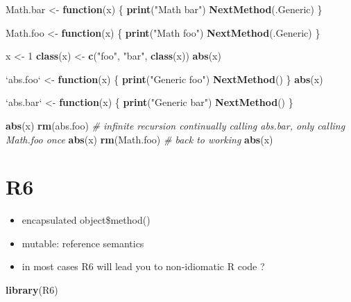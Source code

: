 \documentclass[]{book}
\newenvironment{Shaded}{\begin{snugshade}}{\end{snugshade}}
\newcommand{\CommentTok}[1]{\textcolor[rgb]{0.56,0.35,0.01}{\textit{#1}}}
\newcommand{\ControlFlowTok}[1]{\textcolor[rgb]{0.13,0.29,0.53}{\textbf{#1}}}
\newcommand{\DataTypeTok}[1]{\textcolor[rgb]{0.13,0.29,0.53}{#1}}
\newcommand{\DecValTok}[1]{\textcolor[rgb]{0.00,0.00,0.81}{#1}}
\newcommand{\KeywordTok}[1]{\textcolor[rgb]{0.13,0.29,0.53}{\textbf{#1}}}
\newcommand{\NormalTok}[1]{#1}
\newcommand{\StringTok}[1]{\textcolor[rgb]{0.31,0.60,0.02}{#1}}
\begin{document}
\begin{Shaded}
\begin{Highlighting}[]
\NormalTok{Math.bar <-}\StringTok{ }\ControlFlowTok{function}\NormalTok{(x) \{}
  \KeywordTok{print}\NormalTok{(}\StringTok{"Math bar"}\NormalTok{)}
  \KeywordTok{NextMethod}\NormalTok{(.Generic)}
\NormalTok{\}}

\NormalTok{Math.foo <-}\StringTok{ }\ControlFlowTok{function}\NormalTok{(x) \{}
  \KeywordTok{print}\NormalTok{(}\StringTok{"Math foo"}\NormalTok{)}
  \KeywordTok{NextMethod}\NormalTok{(.Generic)}
\NormalTok{\}}

\NormalTok{x <-}\StringTok{ }\DecValTok{1}
\KeywordTok{class}\NormalTok{(x) <-}\StringTok{ }\KeywordTok{c}\NormalTok{(}\StringTok{"foo"}\NormalTok{, }\StringTok{"bar"}\NormalTok{, }\KeywordTok{class}\NormalTok{(x))}
\KeywordTok{abs}\NormalTok{(x)}

\StringTok{`}\DataTypeTok{abs.foo}\StringTok{`}\NormalTok{ <-}\StringTok{ }\ControlFlowTok{function}\NormalTok{(x) \{}
  \KeywordTok{print}\NormalTok{(}\StringTok{"Generic foo"}\NormalTok{)}
  \KeywordTok{NextMethod}\NormalTok{()}
\NormalTok{\}}
\KeywordTok{abs}\NormalTok{(x)}

\StringTok{`}\DataTypeTok{abs.bar}\StringTok{`}\NormalTok{ <-}\StringTok{ }\ControlFlowTok{function}\NormalTok{(x) \{}
  \KeywordTok{print}\NormalTok{(}\StringTok{"Generic bar"}\NormalTok{)}
  \KeywordTok{NextMethod}\NormalTok{()}
\NormalTok{\}}

\KeywordTok{abs}\NormalTok{(x)}
\KeywordTok{rm}\NormalTok{(abs.foo)}
\CommentTok{# infinite recursion continually calling abs.bar, only calling Math.foo once}
\KeywordTok{abs}\NormalTok{(x)}
\KeywordTok{rm}\NormalTok{(Math.foo)}
\CommentTok{# back to working}
\KeywordTok{abs}\NormalTok{(x)}
\end{Highlighting}
\end{Shaded}

\hypertarget{r6}{%
\chapter{R6}\label{r6}}

\begin{itemize}
\item
  encapsulated object\$method()
\item
  mutable: reference semantics
\item
  in most cases R6 will lead you to non-idiomatic R code ?
\end{itemize}

\begin{Shaded}
\begin{Highlighting}[]
\KeywordTok{library}\NormalTok{(R6)}
\end{Highlighting}
\end{Shaded}


\end{document}
